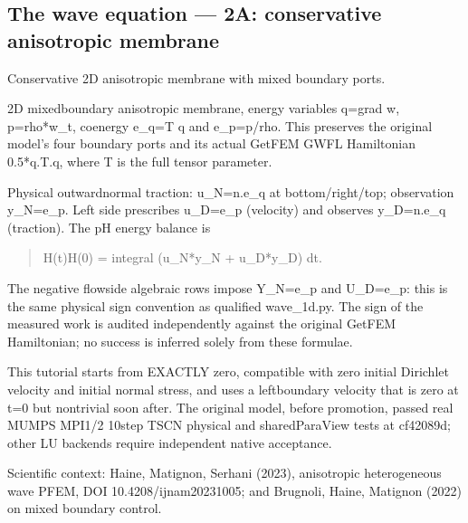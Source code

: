 \documentclass[letterpaper,10pt,english]{sphinxmanual}
\begin{document}
\sphinxstepscope


\subsection{The wave equation — 2A: conservative anisotropic membrane}
\label{\detokenize{examples/wave:the-wave-equation-2a-conservative-anisotropic-membrane}}\label{\detokenize{examples/wave::doc}}\label{\detokenize{examples/wave:wave-2d}}\label{\detokenize{examples/wave:module-examples.wave}}
\sphinxAtStartPar
Conservative 2D anisotropic membrane with mixed boundary ports.

\sphinxAtStartPar
2D mixed\sphinxhyphen{}boundary anisotropic membrane, energy variables q=grad w,
p=rho*w\_t, coenergy e\_q=T q and e\_p=p/rho. This preserves the
original model’s four boundary ports and its actual GetFEM GWFL
Hamiltonian 0.5*q.T.q, where T is the full tensor parameter.

\sphinxAtStartPar
Physical outward\sphinxhyphen{}normal traction: u\_N=n.e\_q at bottom/right/top;
observation y\_N=e\_p. Left side prescribes u\_D=e\_p (velocity) and
observes y\_D=n.e\_q (traction). The pH energy balance is
\begin{quote}

\sphinxAtStartPar
H(t)\sphinxhyphen{}H(0) = integral (u\_N*y\_N + u\_D*y\_D) dt.
\end{quote}

\sphinxAtStartPar
The negative flow\sphinxhyphen{}side algebraic rows impose Y\_N=e\_p and U\_D=e\_p:
this is the same physical sign convention as qualified wave\_1d.py.
The  sign of the measured work is audited independently
against the original GetFEM Hamiltonian; no success is inferred
solely from these formulae.

\sphinxAtStartPar
This tutorial starts from EXACTLY zero, compatible with zero
initial Dirichlet velocity and initial normal stress, and uses
a left\sphinxhyphen{}boundary velocity that is zero at t=0 but nontrivial soon
after. The original model, before promotion, passed real MUMPS MPI1/2
10\sphinxhyphen{}step TSCN physical and shared\sphinxhyphen{}ParaView tests at cf42089d;
other LU backends require independent native acceptance.

\sphinxAtStartPar
Scientific context: Haine, Matignon, Serhani (2023), anisotropic
heterogeneous wave PFEM, DOI 10.4208/ijnam2023\sphinxhyphen{}1005; and
Brugnoli, Haine, Matignon (2022) on mixed boundary control.
\end{document}
